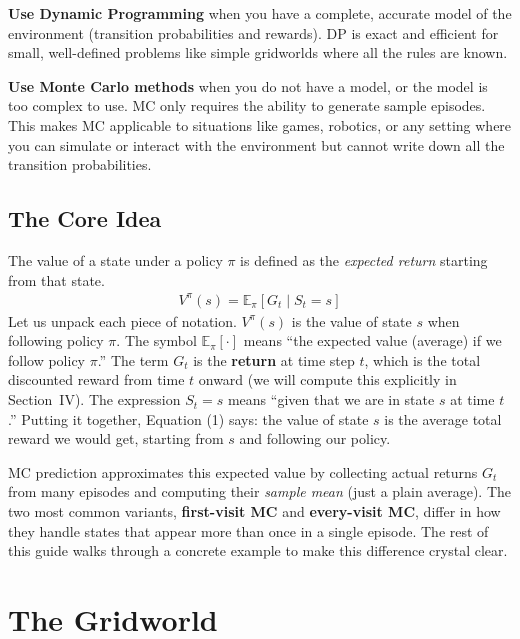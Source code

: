 \documentclass[journal, onecolumn]{IEEEtran}
\newcommand{\vocab}[1]{\textbf{\textcolor{Garnet}{#1}}}
\begin{document}
\begin{tcolorbox}[examplebox={When to Use Which?}]
\textbf{Use Dynamic Programming} when you have a complete, accurate model of the environment (transition probabilities and rewards). DP is exact and efficient for small, well-defined problems like simple gridworlds where all the rules are known.

\textbf{Use Monte Carlo methods} when you do not have a model, or the model is too complex to use. MC only requires the ability to generate sample episodes. This makes MC applicable to situations like games, robotics, or any setting where you can simulate or interact with the environment but cannot write down all the transition probabilities.
\end{tcolorbox}

\subsection{The Core Idea}

The value of a state under a policy $\pi$ is defined as the \textit{expected return} starting from that state.
\begin{align}
    V^\pi(s) = \mathbb{E}_\pi\left[G_t \mid S_t = s\right]
\end{align}
Let us unpack each piece of notation. $V^\pi(s)$ is the value of state $s$ when following policy $\pi$. The symbol $\mathbb{E}_\pi[\cdot]$ means ``the expected value (average) if we follow policy $\pi$.'' The term $G_t$ is the \vocab{return} at time step $t$, which is the total discounted reward from time $t$ onward (we will compute this explicitly in Section~IV). The expression $S_t = s$ means ``given that we are in state $s$ at time $t$.'' Putting it together, Equation (1) says: the value of state $s$ is the average total reward we would get, starting from $s$ and following our policy.

MC prediction approximates this expected value by collecting actual returns $G_t$ from many episodes and computing their \textit{sample mean} (just a plain average). The two most common variants, \vocab{first-visit MC} and \vocab{every-visit MC}, differ in how they handle states that appear more than once in a single episode. The rest of this guide walks through a concrete example to make this difference crystal clear.

\section{The Gridworld}
\end{document}
